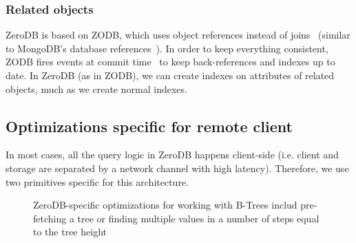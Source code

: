 \documentclass[notitlepage,longbibliography]{revtex4-1}
\begin{document}
\subsubsection{Related objects}

ZeroDB is based on ZODB, which uses object references instead of joins~\cite{zodb-references}
(similar to MongoDB's database references~\cite{mongo-db-references}).
In order to keep everything consistent, ZODB fires events at commit time~\cite{zope-events} to keep back-references and indexes up to date.
In ZeroDB (as in ZODB), we can create indexes on attributes of related objects, much as we create normal indexes.

\subsection{Optimizations specific for remote client}

In most cases, all the query logic in ZeroDB happens client-side (i.e. client and storage are separated by a network channel with high latency).
Therefore, we use two primitives specific for this architecture.

\begin{figure}
	\begin{center}
        \qquad
	\end{center}
    \caption{ZeroDB-specific optimizations for working with B-Trees includ pre-fetching a tree or finding multiple values in a number of steps equal to the tree height}
	\label{fig:tree-traversal-optimizations}
\end{figure}
\end{document}

